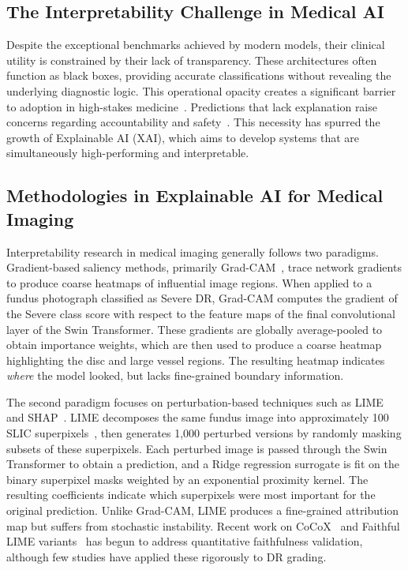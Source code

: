 \documentclass[10pt,twoside]{article}
\begin{document}
\subsection{The Interpretability Challenge in Medical AI}

Despite the exceptional benchmarks achieved by modern models, their clinical utility is constrained by their lack of transparency. These architectures often function as black boxes, providing accurate classifications without revealing the underlying diagnostic logic. This operational opacity creates a significant barrier to adoption in high-stakes medicine~\cite{kelly2019key}. Predictions that lack explanation raise concerns regarding accountability and safety~\cite{benjamens2020state}. This necessity has spurred the growth of Explainable AI (XAI), which aims to develop systems that are simultaneously high-performing and interpretable.

\subsection{Methodologies in Explainable AI for Medical Imaging}

Interpretability research in medical imaging generally follows two paradigms. Gradient-based saliency methods, primarily Grad-CAM~\cite{selvaraju2020grad}, trace network gradients to produce coarse heatmaps of influential image regions. When applied to a fundus photograph classified as Severe DR, Grad-CAM computes the gradient of the Severe class score with respect to the feature maps of the final convolutional layer of the Swin Transformer. These gradients are globally average-pooled to obtain importance weights, which are then used to produce a coarse heatmap highlighting the disc and large vessel regions. The resulting heatmap indicates \emph{where} the model looked, but lacks fine-grained boundary information.

The second paradigm focuses on perturbation-based techniques such as LIME~\cite{ribeiro2016why} and SHAP~\cite{lundberg2017unified}. LIME decomposes the same fundus image into approximately 100 SLIC superpixels~\cite{achanta2012slic}, then generates 1,000 perturbed versions by randomly masking subsets of these superpixels. Each perturbed image is passed through the Swin Transformer to obtain a prediction, and a Ridge regression surrogate is fit on the binary superpixel masks weighted by an exponential proximity kernel. The resulting coefficients indicate which superpixels were most important for the original prediction. Unlike Grad-CAM, LIME produces a fine-grained attribution map but suffers from stochastic instability. Recent work on CoCoX~\cite{cocox2024} and Faithful LIME variants~\cite{knab2025lime} has begun to address quantitative faithfulness validation, although few studies have applied these rigorously to DR grading.
\end{document}
